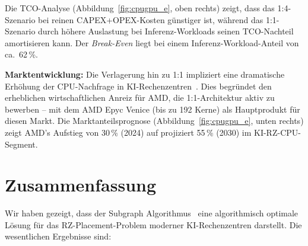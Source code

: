 ﻿\documentclass[a4paper,12pt]{article}
\theoremstyle{definition}
\begin{document}
Die TCO-Analyse (Abbildung~\ref{fig:cpugpu_e}, oben rechts) zeigt, dass das 1:4-Szenario bei reinen CAPEX+OPEX-Kosten g\"{u}nstiger ist, w\"{a}hrend das 1:1-Szenario durch h\"{o}here Auslastung bei Inferenz-Workloads seinen TCO-Nachteil amortisieren kann.
Der \emph{Break-Even} liegt bei einem Inferenz-Workload-Anteil von ca.\ 62\,\%.

\textbf{Marktentwicklung:}
Die Verlagerung hin zu 1:1 impliziert eine dramatische Erh\"{o}hung der CPU-Nachfrage in KI-Rechenzentren~\cite{computerbase2026}.
Dies begr\"{u}ndet den erheblichen wirtschaftlichen Anreiz f\"{u}r AMD, die 1:1-Architektur aktiv zu bewerben -- mit dem AMD Epyc Venice (bis zu 192 Kerne) als Hauptprodukt f\"{u}r diesen Markt.
Die Marktanteilsprognose (Abbildung~\ref{fig:cpugpu_e}, unten rechts) zeigt AMD's Aufstieg von 30\,\% (2024) auf projiziert 55\,\% (2030) im KI-RZ-CPU-Segment.

\section{Zusammenfassung}

Wir haben gezeigt, dass der Subgraph Algorithmus~\cite{epp2026subgraph} eine algorithmisch optimale L\"{o}sung f\"{u}r das RZ-Placement-Problem moderner KI-Rechenzentren darstellt.
Die wesentlichen Ergebnisse sind:
\end{document}
